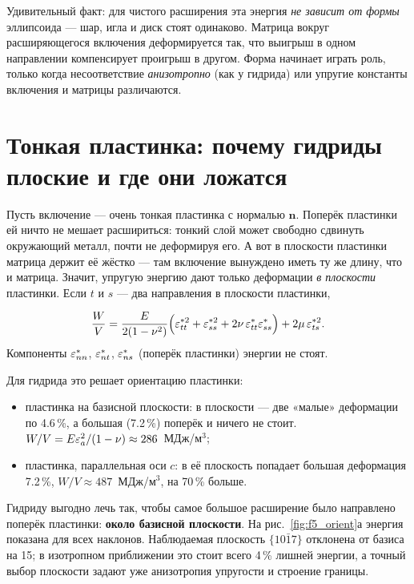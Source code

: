 \begin{idea}
Удивительный факт: для чистого расширения эта энергия \emph{не зависит от формы} эллипсоида --- шар, игла и диск
стоят одинаково. Матрица вокруг расширяющегося включения деформируется так, что выигрыш в одном направлении
компенсирует проигрыш в другом. Форма начинает играть роль, только когда несоответствие \emph{анизотропно} (как у
гидрида) или упругие константы включения и матрицы различаются.
\end{idea}

\section{Тонкая пластинка: почему гидриды плоские и где они ложатся}

Пусть включение --- очень тонкая пластинка с нормалью $\mathbf n$. Поперёк пластинки ей ничто не мешает
расшириться: тонкий слой может свободно сдвинуть окружающий металл, почти не деформируя его. А вот в плоскости
пластинки матрица держит её жёстко --- там включение вынуждено иметь ту же длину, что и матрица. Значит,
упругую энергию дают только деформации \emph{в плоскости} пластинки. Если $t$ и $s$ --- два направления в плоскости
пластинки,
\begin{keyf}
\[
\frac{W}{V} = \frac{E}{2(1-\nu^2)}\Bigl(\varepsilon^{*2}_{tt} + \varepsilon^{*2}_{ss} + 2\nu\,\varepsilon^*_{tt}\varepsilon^*_{ss}\Bigr) + 2\mu\,\varepsilon^{*2}_{ts} .
\]
Компоненты $\varepsilon^*_{nn}$, $\varepsilon^*_{nt}$, $\varepsilon^*_{ns}$ (поперёк пластинки) энергии не стоят.
\end{keyf}

Для гидрида это решает ориентацию пластинки:
\begin{itemize}
\item пластинка на базисной плоскости: в плоскости --- две «малые» деформации по 4.6\,\%, а большая (7.2\,\%)
  поперёк и ничего не стоит. $W/V = E\varepsilon_a^2/(1-\nu) \approx 286$~МДж/м$^3$;
\item пластинка, параллельная оси $c$: в её плоскость попадает большая деформация 7.2\,\%,
  $W/V\approx 487$~МДж/м$^3$, на 70\,\% больше.
\end{itemize}
Гидриду выгодно лечь так, чтобы самое большое расширение было направлено поперёк пластинки: \textbf{около
базисной плоскости}. На рис.~\ref{fig:f5_orient}а энергия показана для всех наклонов. Наблюдаемая плоскость
$\{10\bar17\}$ отклонена от базиса на 15\textdegree; в изотропном приближении это стоит всего 4\,\% лишней энергии,
а точный выбор плоскости задают уже анизотропия упругости и строение границы.


